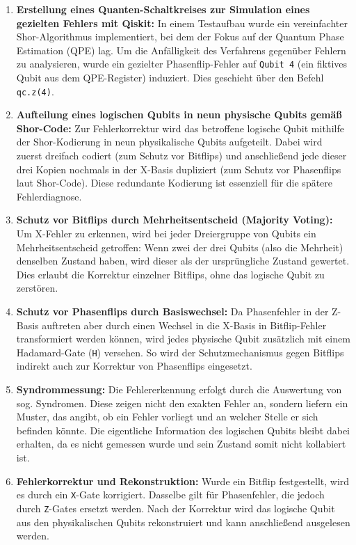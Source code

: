 \begin{enumerate}
    \item \textbf{Erstellung eines Quanten-Schaltkreises zur Simulation eines gezielten Fehlers mit Qiskit:} In einem Testaufbau wurde ein vereinfachter Shor-Algorithmus implementiert, bei dem der Fokus auf der Quantum Phase Estimation (QPE) lag. Um die Anfälligkeit des Verfahrens gegenüber Fehlern zu analysieren, wurde ein gezielter Phasenflip-Fehler auf \texttt{Qubit 4} (ein fiktives Qubit aus dem QPE-Register) induziert. Dies geschieht über den Befehl \texttt{qc.z(4)}.
\medskip
    \item \textbf{Aufteilung eines logischen Qubits in neun physische Qubits gemäß Shor-Code:} Zur Fehlerkorrektur wird das betroffene logische Qubit mithilfe der Shor-Kodierung in neun physikalische Qubits aufgeteilt. Dabei wird zuerst dreifach codiert (zum Schutz vor Bitflips) und anschließend jede dieser drei Kopien nochmals in der X-Basis dupliziert (zum Schutz vor Phasenflips laut Shor-Code). Diese redundante Kodierung ist essenziell für die spätere Fehlerdiagnose.
    \medskip
    \item \textbf{Schutz vor Bitflips durch Mehrheitsentscheid (Majority Voting):} Um X-Fehler zu erkennen, wird bei jeder Dreiergruppe von Qubits ein Mehrheitsentscheid getroffen: Wenn zwei der drei Qubits (also die Mehrheit) denselben Zustand haben, wird dieser als der ursprüngliche Zustand gewertet. Dies erlaubt die Korrektur einzelner Bitflips, ohne das logische Qubit zu zerstören.
\medskip
    \item \textbf{Schutz vor Phasenflips durch Basiswechsel:} Da Phasenfehler in der Z-Basis auftreten aber durch einen Wechsel in die X-Basis in Bitflip-Fehler transformiert werden können, wird jedes physische Qubit zusätzlich mit einem Hadamard-Gate (\texttt{H}) versehen. So wird der Schutzmechanismus gegen Bitflips indirekt auch zur Korrektur von Phasenflips eingesetzt.
\medskip
    \item \textbf{Syndrommessung:} Die Fehlererkennung erfolgt durch die Auswertung von sog. Syndromen. Diese zeigen nicht den exakten Fehler an, sondern liefern ein Muster, das angibt, ob ein Fehler vorliegt und an welcher Stelle er sich befinden könnte. Die eigentliche Information des logischen Qubits bleibt dabei erhalten, da es nicht gemessen wurde und sein Zustand somit nicht kollabiert ist.
\medskip
    \item \textbf{Fehlerkorrektur und Rekonstruktion:}  Wurde ein Bitflip festgestellt, wird es durch ein \texttt{X}-Gate korrigiert. Dasselbe gilt für Phasenfehler, die jedoch durch \texttt{Z}-Gates ersetzt werden. Nach der Korrektur wird das logische Qubit aus den physikalischen Qubits rekonstruiert und kann anschließend ausgelesen werden.
\end{enumerate}

